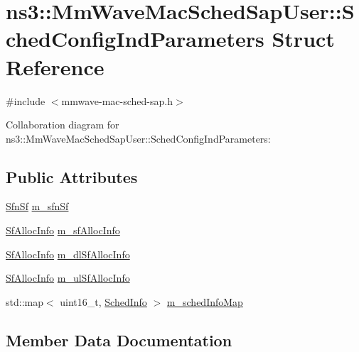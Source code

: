 \hypertarget{structns3_1_1MmWaveMacSchedSapUser_1_1SchedConfigIndParameters}{}\section{ns3\+:\+:Mm\+Wave\+Mac\+Sched\+Sap\+User\+:\+:Sched\+Config\+Ind\+Parameters Struct Reference}
\label{structns3_1_1MmWaveMacSchedSapUser_1_1SchedConfigIndParameters}


{\ttfamily \#include $<$mmwave-\/mac-\/sched-\/sap.\+h$>$}



Collaboration diagram for ns3\+:\+:Mm\+Wave\+Mac\+Sched\+Sap\+User\+:\+:Sched\+Config\+Ind\+Parameters\+:
\subsection*{Public Attributes}
\begin{DoxyCompactItemize}
\item 
\hyperlink{structns3_1_1SfnSf}{Sfn\+Sf} \hyperlink{structns3_1_1MmWaveMacSchedSapUser_1_1SchedConfigIndParameters_a94b982e80f0a15e9f38d12aab4c4b453}{m\+\_\+sfn\+Sf}
\item 
\hyperlink{structns3_1_1SfAllocInfo}{Sf\+Alloc\+Info} \hyperlink{structns3_1_1MmWaveMacSchedSapUser_1_1SchedConfigIndParameters_af7f098d95ab6d21cda8737a739dfd3f6}{m\+\_\+sf\+Alloc\+Info}
\item 
\hyperlink{structns3_1_1SfAllocInfo}{Sf\+Alloc\+Info} \hyperlink{structns3_1_1MmWaveMacSchedSapUser_1_1SchedConfigIndParameters_abf83fdd67bfb366c28cc2fd53df6b51b}{m\+\_\+dl\+Sf\+Alloc\+Info}
\item 
\hyperlink{structns3_1_1SfAllocInfo}{Sf\+Alloc\+Info} \hyperlink{structns3_1_1MmWaveMacSchedSapUser_1_1SchedConfigIndParameters_ab695491bd544f1a8483ae5392c8fec4e}{m\+\_\+ul\+Sf\+Alloc\+Info}
\item 
std\+::map$<$ uint16\+\_\+t, \hyperlink{structns3_1_1SchedInfo}{Sched\+Info} $>$ \hyperlink{structns3_1_1MmWaveMacSchedSapUser_1_1SchedConfigIndParameters_aea8001056aa0bf871ebe9ae7f8aedce2}{m\+\_\+sched\+Info\+Map}
\end{DoxyCompactItemize}


\subsection{Member Data Documentation}
